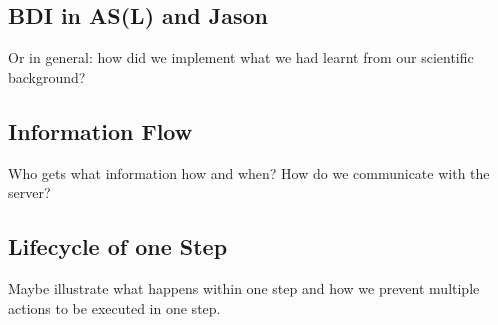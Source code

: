 \subsection{BDI in AS(L) and Jason}
Or in general: how did we implement what we had learnt from our scientific background?
\subsection{Information Flow}
Who gets what information how and when? How do we communicate with the server?
\subsection{Lifecycle of one Step}
Maybe illustrate what happens within one step and how we prevent multiple actions to be executed in one step.
